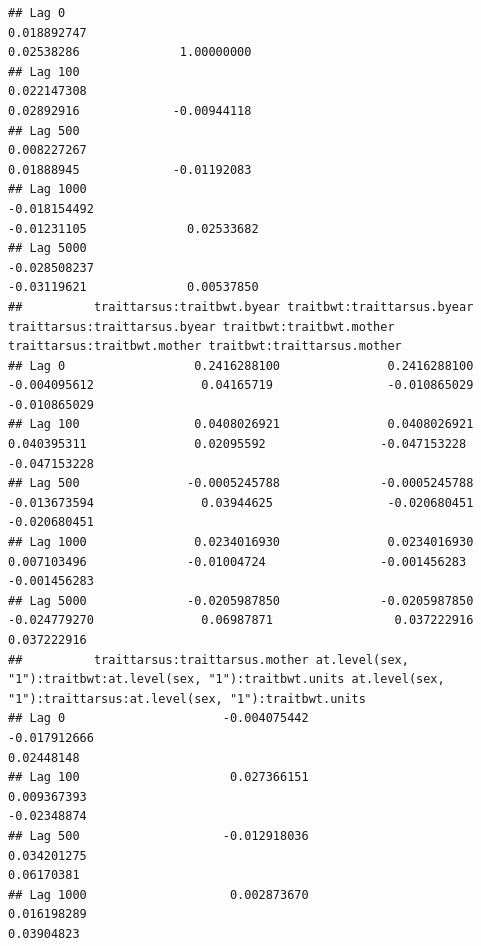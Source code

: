 \documentclass[
  12pt,
]{book}
\begin{document}
\begin{verbatim}
## Lag 0                                                          0.018892747                                                           0.02538286              1.00000000
## Lag 100                                                        0.022147308                                                           0.02892916             -0.00944118
## Lag 500                                                        0.008227267                                                           0.01888945             -0.01192083
## Lag 1000                                                      -0.018154492                                                          -0.01231105              0.02533682
## Lag 5000                                                      -0.028508237                                                          -0.03119621              0.00537850
##          traittarsus:traitbwt.byear traitbwt:traittarsus.byear traittarsus:traittarsus.byear traitbwt:traitbwt.mother traittarsus:traitbwt.mother traitbwt:traittarsus.mother
## Lag 0                  0.2416288100               0.2416288100                  -0.004095612               0.04165719                -0.010865029                -0.010865029
## Lag 100                0.0408026921               0.0408026921                   0.040395311               0.02095592                -0.047153228                -0.047153228
## Lag 500               -0.0005245788              -0.0005245788                  -0.013673594               0.03944625                -0.020680451                -0.020680451
## Lag 1000               0.0234016930               0.0234016930                   0.007103496              -0.01004724                -0.001456283                -0.001456283
## Lag 5000              -0.0205987850              -0.0205987850                  -0.024779270               0.06987871                 0.037222916                 0.037222916
##          traittarsus:traittarsus.mother at.level(sex, "1"):traitbwt:at.level(sex, "1"):traitbwt.units at.level(sex, "1"):traittarsus:at.level(sex, "1"):traitbwt.units
## Lag 0                      -0.004075442                                                  -0.017912666                                                       0.02448148
## Lag 100                     0.027366151                                                   0.009367393                                                      -0.02348874
## Lag 500                    -0.012918036                                                   0.034201275                                                       0.06170381
## Lag 1000                    0.002873670                                                   0.016198289                                                       0.03904823

\end{verbatim}
\end{document}
